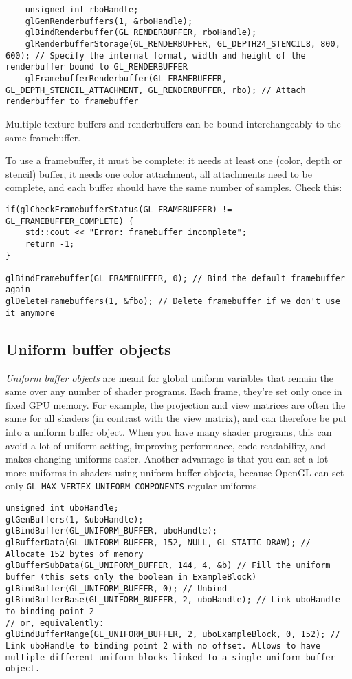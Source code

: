 \documentclass[8pt, table, xcdraw]{article}%
\begin{document}
\begin{itemize}
    \begin{lstlisting}
    unsigned int rboHandle;
    glGenRenderbuffers(1, &rboHandle);
    glBindRenderbuffer(GL_RENDERBUFFER, rboHandle);
    glRenderbufferStorage(GL_RENDERBUFFER, GL_DEPTH24_STENCIL8, 800, 600); // Specify the internal format, width and height of the renderbuffer bound to GL_RENDERBUFFER
    glFramebufferRenderbuffer(GL_FRAMEBUFFER, GL_DEPTH_STENCIL_ATTACHMENT, GL_RENDERBUFFER, rbo); // Attach renderbuffer to framebuffer
    \end{lstlisting}
\end{itemize}

Multiple texture buffers and renderbuffers can be bound interchangeably to the same framebuffer.

To use a framebuffer, it must be complete: it needs at least one (color, depth or stencil) buffer, it needs one color attachment, all attachments need to be complete, and each buffer should have the same number of samples. Check this:

\begin{lstlisting}
if(glCheckFramebufferStatus(GL_FRAMEBUFFER) != GL_FRAMEBUFFER_COMPLETE) {
    std::cout << "Error: framebuffer incomplete";
    return -1;
}

glBindFramebuffer(GL_FRAMEBUFFER, 0); // Bind the default framebuffer again
glDeleteFramebuffers(1, &fbo); // Delete framebuffer if we don't use it anymore
\end{lstlisting}

\subsection{Uniform buffer objects}

\emph{Uniform buffer objects} are meant for global uniform variables that remain the same over any number of shader programs. Each frame, they're set only once in fixed GPU memory. For example, the projection and view matrices are often the same for all shaders (in contrast with the view matrix), and can therefore be put into a uniform buffer object. When you have many shader programs, this can avoid a lot of uniform setting, improving performance, code readability, and makes changing uniforms easier. Another advantage is that you can set a lot more uniforms in shaders using uniform buffer objects, because OpenGL can set only \lstinline{GL_MAX_VERTEX_UNIFORM_COMPONENTS} regular uniforms.

\begin{lstlisting}
unsigned int uboHandle;
glGenBuffers(1, &uboHandle);
glBindBuffer(GL_UNIFORM_BUFFER, uboHandle);
glBufferData(GL_UNIFORM_BUFFER, 152, NULL, GL_STATIC_DRAW); // Allocate 152 bytes of memory
glBufferSubData(GL_UNIFORM_BUFFER, 144, 4, &b) // Fill the uniform buffer (this sets only the boolean in ExampleBlock)
glBindBuffer(GL_UNIFORM_BUFFER, 0); // Unbind
glBindBufferBase(GL_UNIFORM_BUFFER, 2, uboHandle); // Link uboHandle to binding point 2
// or, equivalently:
glBindBufferRange(GL_UNIFORM_BUFFER, 2, uboExampleBlock, 0, 152); // Link uboHandle to binding point 2 with no offset. Allows to have multiple different uniform blocks linked to a single uniform buffer object.
\end{lstlisting}
\end{document}
